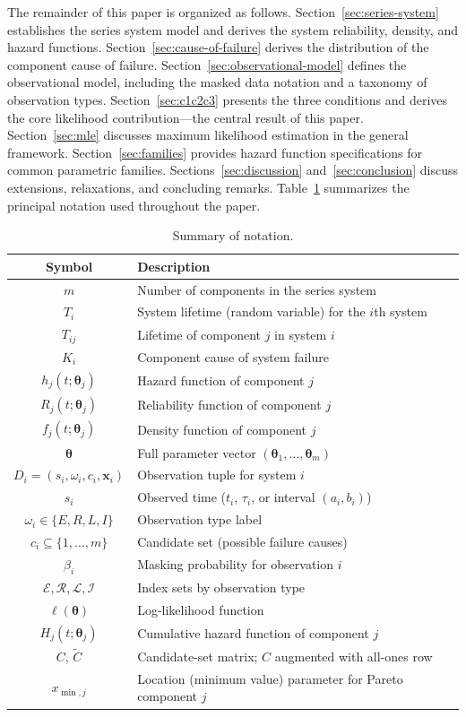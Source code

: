 \documentclass[11pt]{article}
\theoremstyle{definition}
\theoremstyle{plain}
\renewcommand{\v}[1]{\boldsymbol{#1}}
\newcommand{\btheta}{\v{\theta}}
\begin{document}
The remainder of this paper is organized as follows.
Section~\ref{sec:series-system} establishes the series system model and
derives the system reliability, density, and hazard functions.
Section~\ref{sec:cause-of-failure} derives the distribution of the
component cause of failure.
Section~\ref{sec:observational-model} defines the observational model,
including the masked data notation and a taxonomy of observation types.
Section~\ref{sec:c1c2c3} presents the three conditions and derives the
core likelihood contribution---the central result of this paper.
Section~\ref{sec:mle} discusses maximum likelihood estimation in the
general framework.
Section~\ref{sec:families} provides hazard function specifications for
common parametric families.
Sections~\ref{sec:discussion} and~\ref{sec:conclusion} discuss extensions,
relaxations, and concluding remarks.
Table~\ref{tab:notation} summarizes the principal notation used
throughout the paper.

\begin{table}[ht]
\centering
\caption{Summary of notation.}
\label{tab:notation}
\small
\renewcommand{\arraystretch}{1.15}
\begin{tabular}{@{}cl@{}}
\toprule
\textbf{Symbol} & \textbf{Description} \\
\midrule
$m$ & Number of components in the series system \\
$T_i$ & System lifetime (random variable) for the $i$th system \\
$T_{ij}$ & Lifetime of component $j$ in system $i$ \\
$K_i$ & Component cause of system failure \\
$h_j(t; \v{\theta}_j)$ & Hazard function of component $j$ \\
$R_j(t; \v{\theta}_j)$ & Reliability function of component $j$ \\
$f_j(t; \v{\theta}_j)$ & Density function of component $j$ \\
$\btheta$ & Full parameter vector $(\v{\theta}_1, \ldots, \v{\theta}_m)$ \\
$D_i = (s_i, \omega_i, c_i, \v{x}_i)$ & Observation tuple for system $i$ \\
$s_i$ & Observed time ($t_i$, $\tau_i$, or interval $(a_i, b_i)$) \\
$\omega_i \in \{E, R, L, I\}$ & Observation type label \\
$c_i \subseteq \{1,\ldots,m\}$ & Candidate set (possible failure causes) \\
$\beta_i$ & Masking probability for observation $i$ \\
$\mathcal{E}, \mathcal{R}, \mathcal{L}, \mathcal{I}$
    & Index sets by observation type \\
$\ell(\btheta)$ & Log-likelihood function \\
$H_j(t; \v{\theta}_j)$ & Cumulative hazard function of component $j$ \\
$C$, $\tilde{C}$ & Candidate-set matrix; $C$ augmented with all-ones row \\
$x_{\min,j}$ & Location (minimum value) parameter for Pareto component $j$ \\
\bottomrule
\end{tabular}
\end{table}
\end{document}
